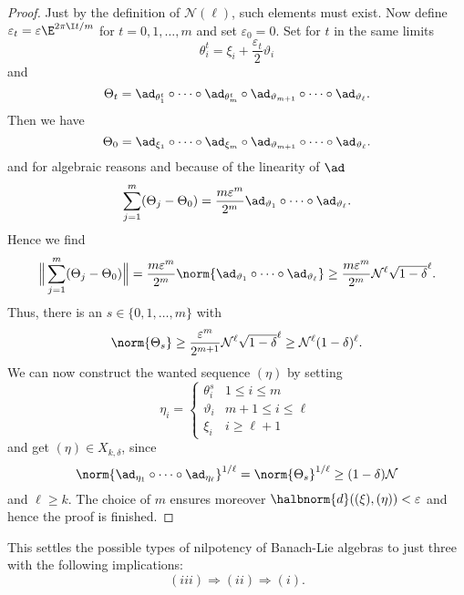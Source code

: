 \documentclass[
11pt,                          %
english                        %
]{article}
\begin{document}
\begin{proof}
	Just by the definition of $\mathcal{N}(\ell)$, such elements must exist.
	Now define $\varepsilon_t = \varepsilon \E^{2 \pi \I t/m} $ for $t = 0, 1, 
	\ldots, m$ and set $\varepsilon_0 = 0$. Set for $t$ in the same limits
	\begin{equation*}
		\theta_i^t
		=
		\xi_i + \frac{\varepsilon_t}{2} \vartheta_i
	\end{equation*}
	and
	\begin{equation*}
		\Theta_t
		=
		\ad_{\theta_1^t} \circ \cdots \circ \ad_{\theta_m^t}
		\circ
		\ad_{\vartheta_{m+1}} \circ \cdots \circ \ad_{\vartheta_\ell}.
	\end{equation*}
	Then we have
	\begin{equation*}
		\Theta_0
		=
		\ad_{\xi_1} \circ \cdots \circ \ad_{\xi_m}
		\circ
		\ad_{\vartheta_{m+1}} \circ \cdots \circ \ad_{\vartheta_\ell}.
	\end{equation*}
	and for algebraic reasons and because of the linearity of $\ad$
	\begin{equation*}
		\sum\limits_{j=1}^m
		(\Theta_j - \Theta_0)
		=
		\frac{m \varepsilon^m}{2^m}
		\ad_{\vartheta_1} \circ \cdots \circ \ad_{\vartheta_\ell}.
	\end{equation*}
	Hence we find
	\begin{equation*}
		\Big\Vert
			\sum\limits_{j=1}^m
			(\Theta_j - \Theta_0)
		\Big\Vert
		=
		\frac{m \varepsilon^m}{2^m}
		\norm{ \ad_{\vartheta_1} \circ \cdots \circ \ad_{\vartheta_\ell} }
		\geq
		\frac{m \varepsilon^m}{2^m}
		\mathcal{N}^\ell
		\sqrt{1-\delta}^\ell.
	\end{equation*}
	Thus, there is an $s \in \{0, 1, \ldots, m\}$ with
	\begin{equation*}
		\norm{\Theta_s}
		\geq
		\frac{\varepsilon^m}{2^{m + 1}}
		\mathcal{N}^\ell
		\sqrt{1- \delta}^\ell
		\geq
		\mathcal{N}^\ell (1- \delta)^\ell.
	\end{equation*}
	We can now construct the wanted sequence $(\eta)$ by setting
	\begin{equation*}
		\eta_i
		=
		\begin{cases}
			\theta_i^s
			&
			1 \leq i \leq m
			\\
			\vartheta_i
			&
			m+1 \leq i \leq \ell
			\\
			\xi_i
			&
			i \geq \ell + 1
		\end{cases}
	\end{equation*}
	and get $(\eta) \in X_{k, \delta}$, since
	\begin{equation*}
		\norm{ \ad_{\eta_1} \circ \cdots \circ \ad_{\eta_\ell}}^{1/\ell}
		=
		\norm{ \Theta_s }^{1/\ell}
		\geq
		(1 - \delta) \mathcal{N}
	\end{equation*}
	and $\ell \geq k$. The choice of $m$ ensures moreover $\halbnorm{d}((\xi), 
	(\eta)) < \varepsilon$ and hence the proof is finished.
\end{proof}
This settles the possible types of nilpotency of Banach-Lie algebras to just three with the following implications:
\begin{equation}
	\label{nilpotencytypes}
	(iii) \Longrightarrow (ii) \Longrightarrow (i).
\end{equation}
\end{document}
